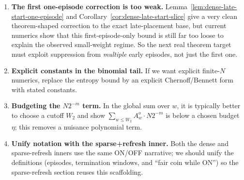 \begin{enumerate}
A particularly clean next target is to express that correction through the hypergeometric early-start count from
Corollary~\ref{cor:isolated-early-count}, or even just through the exact expected early-pair count from
Corollary~\ref{cor:isolated-early-pair-mean}, rather than through the full run count. Current overlap fits also
suggest that the coefficients in such an early-pair correction vary smoothly with the one-run base parameter
\(q_1\) and with \(1/m\), which makes this look much closer to a real analytic theorem target than a one-off fit.

\item \textbf{The first one-episode correction is too weak.}
Lemma~\ref{lem:dense-late-start-one-episode} and Corollary~\ref{cor:dense-late-start-slice} give a very clean
theorem-shaped correction to the exact late-placement base, but current numerics show that this first-episode-only
bound is still far too loose to explain the observed small-weight regime. So the next real theorem target must exploit
suppression from \emph{multiple} early episodes, not just the first one.

\item \textbf{Explicit constants in the binomial tail.}
If we want explicit finite-$N$ numerics, replace the entropy bound by an explicit Chernoff/Bennett form
with stated constants.

\item \textbf{Budgeting the $N2^{-m}$ term.}
In the global sum over $w$, it is typically better to choose a cutoff $W_2$ and show
$\sum_{w\le W_2} A_w^o \cdot N2^{-m}$ is below a chosen budget $\eta$; this removes a nuisance polynomial term.

\item \textbf{Unify notation with the sparse+refresh inner.}
Both the dense and sparse-refresh inners use the same ON/OFF narrative; we should unify the definitions
(episodes, termination windows, and ``fair coin while ON'') so the sparse-refresh section reuses this scaffolding.
\end{enumerate}
